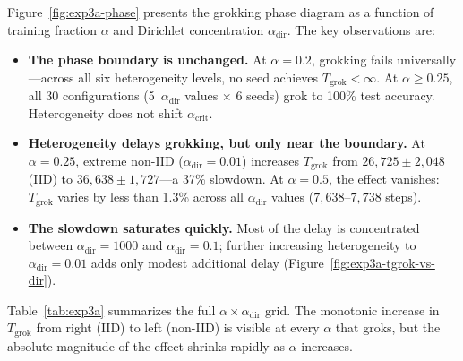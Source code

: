 Figure~\ref{fig:exp3a-phase} presents the grokking phase diagram as a function
of training fraction $\alpha$ and Dirichlet concentration
$\alpha_{\mathrm{dir}}$.  The key observations are:

\begin{itemize}
  \item \textbf{The phase boundary is unchanged.}  At $\alpha{=}0.2$, grokking
        fails universally---across all six heterogeneity levels, no seed
        achieves $T_{\mathrm{grok}} < \infty$.  At $\alpha \geq 0.25$, all
        30 configurations (5~$\alpha_{\mathrm{dir}}$ values $\times$ 6
        seeds) grok to 100\% test accuracy.  Heterogeneity does not shift
        $\alpha_{\mathrm{crit}}$.

  \item \textbf{Heterogeneity delays grokking, but only near the boundary.}
        At $\alpha{=}0.25$, extreme non-IID ($\alpha_{\mathrm{dir}}{=}0.01$)
        increases $T_{\mathrm{grok}}$ from $26{,}725 \pm 2{,}048$ (IID) to
        $36{,}638 \pm 1{,}727$---a 37\% slowdown.  At $\alpha{=}0.5$, the
        effect vanishes: $T_{\mathrm{grok}}$ varies by less than 1.3\% across
        all $\alpha_{\mathrm{dir}}$ values ($7{,}638$--$7{,}738$ steps).

  \item \textbf{The slowdown saturates quickly.}  Most of the delay is
        concentrated between $\alpha_{\mathrm{dir}}{=}1000$ and
        $\alpha_{\mathrm{dir}}{=}0.1$; further increasing heterogeneity to
        $\alpha_{\mathrm{dir}}{=}0.01$ adds only modest additional delay
        (Figure~\ref{fig:exp3a-tgrok-vs-dir}).
\end{itemize}

Table~\ref{tab:exp3a} summarizes the full $\alpha \times
\alpha_{\mathrm{dir}}$ grid.  The monotonic increase in $T_{\mathrm{grok}}$
from right (IID) to left (non-IID) is visible at every $\alpha$ that groks,
but the absolute magnitude of the effect shrinks rapidly as $\alpha$ increases.

